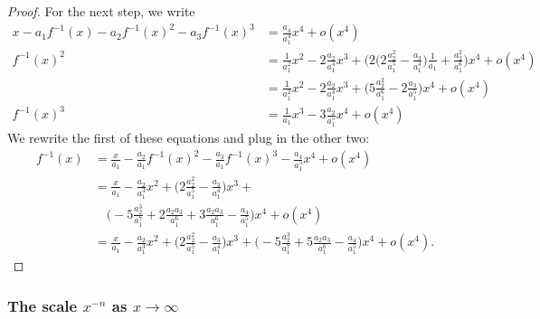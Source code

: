 \begin{proof}
For the next step, we write
\begin{align*}
x - a_1 f^{-1}(x) - a_2 f^{-1}(x)^2 - a_3 f^{-1}(x)^3 &= \frac{a_4}{a_1^4}x^4 + o(x^4) \\
f^{-1}(x)^2 &= \frac{1}{a_1^2}x^2 - 2 \frac{a_2}{a_1^4}x^3 + \bigg(2\Big(2 \frac{a_2^2}{a_1^5} - \frac{a_3}{a_1^4}\Big)\frac{1}{a_1} + \frac{a_2^2}{a_1^6}\bigg)x^4 + o(x^4) \\
&= \frac{1}{a_1^2}x^2 - 2 \frac{a_2}{a_1^4}x^3 + \Big(5 \frac{a_2^2}{a_1^6} - 2\frac{a_3}{a_1^5}\Big)x^4 + o(x^4) \\
f^{-1}(x)^3 &= \frac{1}{a_1}x^3 - 3 \frac{a_2}{a_1^5}x^4 + o(x^4)
\end{align*}
We rewrite the first of these equations and plug in the other two:
\begin{align*}
f^{-1}(x) &= \frac{x}{a_1} - \frac{a_2}{a_1}f^{-1}(x)^2 - \frac{a_3}{a_1}f^{-1}(x)^3 - \frac{a_4}{a_1^5}x^4 + o(x^4) \\
&= \frac{x}{a_1} - \frac{a_2}{a_1^3}x^2 + \Big(2 \frac{a_2^2}{a_1^5} - \frac{a_3}{a_1^4}\Big)x^3 + \\
&\quad \Big(- 5 \frac{a_2^3}{a_1^7} + 2\frac{a_2a_3}{a_1^6} + 3 \frac{a_2a_3}{a_1^6} - \frac{a_4}{a_1^5} \Big)x^4 + o(x^4) \\
&= \frac{x}{a_1} - \frac{a_2}{a_1^3}x^2 + \Big(2 \frac{a_2^2}{a_1^5} - \frac{a_3}{a_1^4}\Big)x^3 + \Big(- 5 \frac{a_2^3}{a_1^7} + 5\frac{a_2a_3}{a_1^6} - \frac{a_4}{a_1^5} \Big)x^4 + o(x^4).
\end{align*}
\end{proof}


\subsubsection{The scale $x^{-n}$ as $x\to \infty$}

